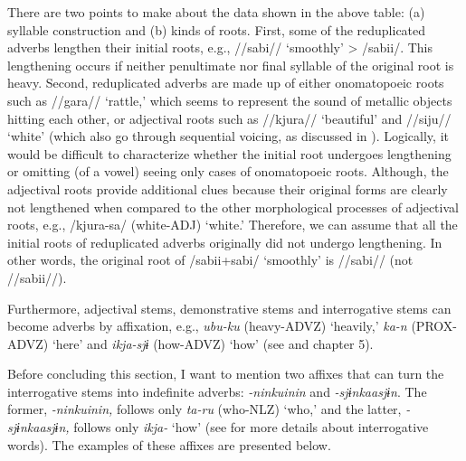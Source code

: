 There are two points to make about the data shown in the above table: (a) syllable construction and (b) kinds of roots. First, some of the reduplicated adverbs lengthen their initial roots, e.g., //sabi// ‘smoothly’ > /sabii/. This lengthening occurs if neither penultimate nor final syllable of the original root is heavy. Second, reduplicated adverbs are made up of either onomatopoeic roots such as //gara// ‘rattle,’ which seems to represent the sound of metallic objects hitting each other, or adjectival roots such as //kjura// ‘beautiful’ and //siju// ‘white’ (which also go through sequential voicing, as discussed in ). Logically, it would be difficult to characterize whether the initial root undergoes lengthening or omitting (of a vowel) seeing only cases of onomatopoeic roots. Although, the adjectival roots provide additional clues because their original forms are clearly not lengthened when compared to the other morphological processes of adjectival roots, e.g., /kjura-sa/ (white-ADJ) ‘white.’ Therefore, we can assume that all the initial roots of reduplicated adverbs originally did not undergo lengthening. In other words, the original root of /sabii+sabi/ ‘smoothly’ is //sabi// (not //sabii//).

Furthermore, adjectival stems, demonstrative stems and interrogative stems can become adverbs by affixation, e.g., \textit{ubu-ku} (heavy-ADVZ) ‘heavily,’ \textit{ka-n} (PROX-ADVZ) ‘here’ and \textit{ikja-sjɨ} (how-ADVZ) ‘how’ (see  and chapter 5).

Before concluding this section, I want to mention two affixes that can turn the interrogative stems into indefinite adverbs: \textit{{}-ninkuinin} and \textit{{}-sjɨnkaasjɨn}. The former, \textit{{}-ninkuinin,} follows only \textit{ta-ru} (who-NLZ) ‘who,’ and the latter, \textit{{}-sjɨnkaasjɨn,} follows only \textit{ikja-} ‘how’ (see  for more details about interrogative words). The examples of these affixes are presented below.

